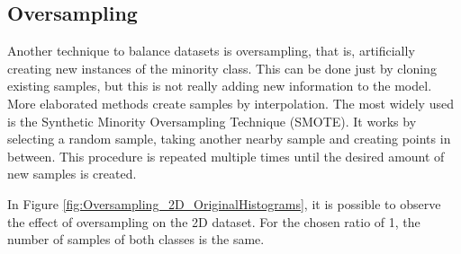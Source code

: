 \documentclass[conference]{IEEEtran}
\begin{document}
	\subsection{Oversampling}
	
	Another technique to balance datasets is oversampling, that is, artificially creating new instances of the minority class. This can be done just by cloning existing samples, but this is not really adding new information to the model. More elaborated methods create samples by interpolation. The most widely used is the Synthetic Minority Oversampling Technique (SMOTE). It works by selecting a random sample, taking another nearby sample and creating points in between. This procedure is repeated multiple times until the desired amount of new samples is created.
	
	In Figure \ref{fig:Oversampling_2D_OriginalHistograms}, it is possible to observe the effect of oversampling on the 2D dataset. For the chosen ratio of 1, the number of samples of both classes is the same.
	
\end{document}
